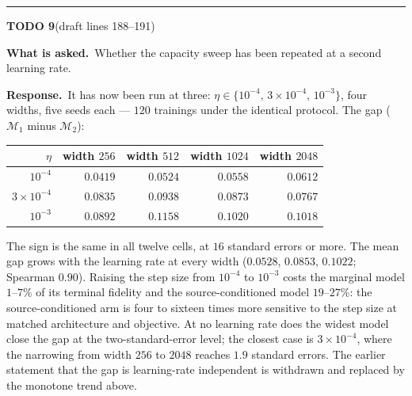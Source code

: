 \documentclass[11pt]{article}
\newcommand{\M}{\mathcal M}
\newenvironment{todoitem}[2]{%
  \par\medskip\noindent\rule{\textwidth}{0.7pt}\par\nobreak\smallskip
  \noindent\textbf{\large TODO #1}\quad\textnormal{\small(draft #2)}\par\nobreak\smallskip
}{\par\medskip}
\newcommand{\ask}[1]{\noindent\textbf{What is asked.}\ #1\par\smallskip}
\newcommand{\resp}[1]{\noindent\textbf{Response.}\ #1\par}
\begin{document}
\begin{todoitem}{9}{lines 188--191}
\ask{Whether the capacity sweep has been repeated at a second learning rate.}

\resp{It has now been run at three: $\eta\in\{10^{-4},\,3\times10^{-4},\,10^{-3}\}$, four widths,
five seeds each --- $120$ trainings under the identical protocol. The gap ($\M_1$ minus $\M_2$):

\begin{center}
\small
\begin{tabular}{@{}rrrrr@{}}
\toprule
$\eta$ & width $256$ & width $512$ & width $1024$ & width $2048$\\
\midrule
$10^{-4}$          & $0.0419$ & $0.0524$ & $0.0558$ & $0.0612$\\
$3\times10^{-4}$   & $0.0835$ & $0.0938$ & $0.0873$ & $0.0767$\\
$10^{-3}$          & $0.0892$ & $0.1158$ & $0.1020$ & $0.1018$\\
\bottomrule
\end{tabular}
\end{center}

The sign is the same in all twelve cells, at $16$ standard errors or more. The mean gap grows
with the learning rate at every width ($0.0528$, $0.0853$, $0.1022$; Spearman $0.90$). Raising
the step size from $10^{-4}$ to $10^{-3}$ costs the marginal model $1$--$7\%$ of its terminal
fidelity and the source-conditioned model $19$--$27\%$: the source-conditioned arm is four to
sixteen times more sensitive to the step size at matched architecture and objective. At no
learning rate does the widest model close the gap at the two-standard-error level; the closest
case is $3\times10^{-4}$, where the narrowing from width $256$ to $2048$ reaches $1.9$ standard
errors. The earlier statement that the gap is learning-rate independent is withdrawn and
replaced by the monotone trend above.}
\end{todoitem}
\end{document}
